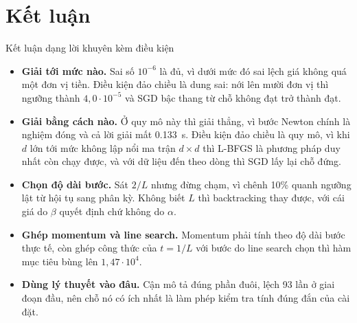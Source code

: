 \documentclass[10pt, aspectratio=169]{beamer}
\begin{document}
\section{Kết luận}

\begin{frame}{Kết luận dạng lời khuyên kèm điều kiện}
  \begin{itemize}
    \item \textbf{Giải tới mức nào.} Sai số $10^{-6}$ là đủ, vì dưới mức đó sai
          lệch giá không quá một đơn vị tiền. Điều kiện đảo chiều là dung sai:
          nới lên mười đơn vị thì ngưỡng thành $4{,}0 \cdot 10^{-5}$ và SGD bậc
          thang từ chỗ không đạt trở thành đạt.
    \item \textbf{Giải bằng cách nào.} Ở quy mô này thì giải thẳng, vì bước
          Newton chính là nghiệm đóng và cả lời giải mất \SI{0.133}{\second}.
          Điều kiện đảo chiều là quy mô, vì khi $d$ lớn tới mức không lập nổi ma
          trận $d \times d$ thì L-BFGS là phương pháp duy nhất còn chạy được, và
          với dữ liệu đến theo dòng thì SGD lấy lại chỗ đứng.
    \item \textbf{Chọn độ dài bước.} Sát $2/L$ nhưng đừng chạm, vì chênh 10\%
          quanh ngưỡng lật từ hội tụ sang phân kỳ. Không biết $L$ thì
          backtracking thay được, với cái giá do $\beta$ quyết định chứ không do
          $\alpha$.
    \item \textbf{Ghép momentum và line search.} Momentum phải tính theo độ dài
          bước thực tế, còn ghép công thức của $t = 1/L$ với bước do line search
          chọn thì hàm mục tiêu bùng lên $1{,}47 \cdot 10^{4}$.
    \item \textbf{Dùng lý thuyết vào đâu.} Cận mô tả đúng phần đuôi, lệch 93 lần
          ở giai đoạn đầu, nên chỗ nó có ích nhất là làm phép kiểm tra tính đúng
          đắn của cài đặt.
  \end{itemize}
\end{frame}
\end{document}
